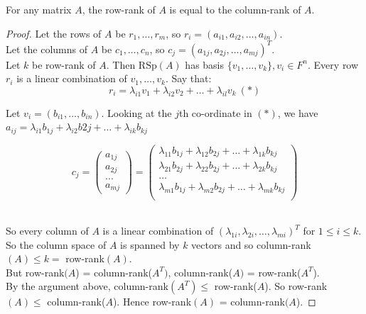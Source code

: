 \documentclass[twoside]{scrartcl}
\begin{document}
\begin{theorem} For any matrix $A$, the row-rank of $A$ is equal to the column-rank of $A$.\end{theorem}
 
 \begin{proof}
 Let the rows of $A$ be $r_1, \dots, r_m$, so $r_i = (a_{i1}, a_{i2},\dots,a_{in})$.\\
 
 Let the columns of $A$ be $c_1,\dots,c_n$, so $c_j = (a_{1j}, a_{2j},\dots,a_{mj})^T$.\\
 
 Let $k$ be row-rank of $A$. Then $\text{RSp}(A)$ has basis $\{v_1,\dots,v_k\}, v_i \in F^n$. Every row $r_i$ is a linear combination of $v_1,\dots,v_k$. Say that:
 \[r_i = \lambda_{i1}v_1 + \lambda_{i2}v_2 + \dots + \lambda_{il}v_k ~(*)\]
 
 Let $v_i = (b_{i1}, \dots, b_{in})$. Looking at the $j$th co-ordinate in $(*)$, we have $a_{ij} = \lambda_{i1}b_{1j} + \lambda_{i2}b{2j} + \dots + \lambda_{ik}b_{kj}$
 
 \[c_j = \begin{pmatrix}
 a_{1j}\\a_{2j}\\ ... \\ a_{mj}
\end{pmatrix}
= 
\begin{pmatrix}
\lambda_{11}b_{1j} + \lambda_{12}b_{2j} + \dots + \lambda_{1k}b_{kj}\\
\lambda_{21}b_{2j} + \lambda_{22}b_{2j} + \dots + \lambda_{2k}b_{kj}\\
\dots \\
\lambda_{m1}b_{1j} + \lambda_{m2}b_{2j} + \dots + \lambda_{mk}b_{kj}\\
\end{pmatrix}\]~

So every column of $A$ is a linear combination of $(\lambda_{1i},\lambda_{2i},\dots,\lambda_{mi})^T$ for $1 \leq i \leq k$. So the column space of $A$ is spanned by $k$ vectors and so column-rank$(A) \leq k = $ row-rank$(A)$.\\

 But row-rank$(A$) = column-rank($A^T)$, column-rank($A)$ = row-rank($A^T$).\\
 
  By the argument above, column-rank$(A^T) \leq$ row-rank($A$). So row-rank$(A) \leq$ column-rank($A$). Hence row-rank$(A)$ = column-rank$(A$).
 \end{proof}\vspace*{5pt}
\end{document}
